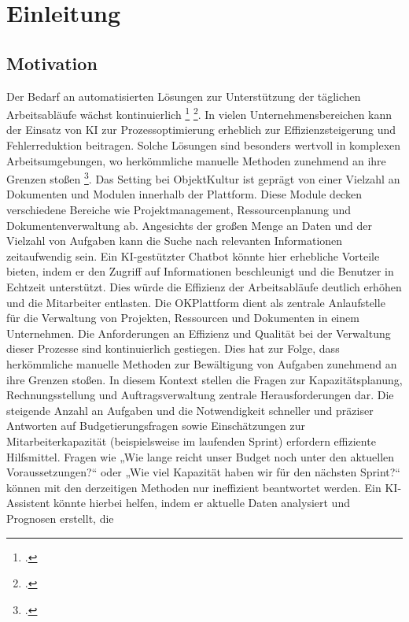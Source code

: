 \chapter{Einleitung}

\section{Motivation}

Der Bedarf an automatisierten Lösungen zur Unterstützung der täglichen Arbeitsabläufe wächst 
kontinuierlich \footcite{demary_kunstliche_2019} \footcite{feike_kunstliche_2024}. In vielen Unternehmensbereichen kann der Einsatz von \ac{KI} zur Prozessoptimierung erheblich zur Effizienzsteigerung und Fehlerreduktion beitragen. Solche Lösungen sind besonders 
wertvoll in komplexen Arbeitsumgebungen, wo herkömmliche manuelle Methoden zunehmend an ihre 
Grenzen stoßen \footcite{lenzen_kunstliche_2023}.
Das Setting bei ObjektKultur ist geprägt von einer Vielzahl an Dokumenten und Modulen innerhalb der 
Plattform. Diese Module decken verschiedene Bereiche wie Projektmanagement, Ressourcenplanung 
und Dokumentenverwaltung ab. Angesichts der großen Menge an Daten und der Vielzahl von Aufgaben 
kann die Suche nach relevanten Informationen zeitaufwendig sein. Ein \ac{KI}-gestützter Chatbot könnte 
hier erhebliche Vorteile bieten, indem er den Zugriff auf Informationen beschleunigt und die Benutzer 
in Echtzeit unterstützt. Dies würde die Effizienz der Arbeitsabläufe deutlich erhöhen und die Mitarbeiter 
entlasten.
Die OKPlattform dient als zentrale Anlaufstelle für die Verwaltung von Projekten, Ressourcen und 
Dokumenten in einem Unternehmen. Die Anforderungen an Effizienz und Qualität bei der Verwaltung 
dieser Prozesse sind kontinuierlich gestiegen. Dies hat zur Folge, dass herkömmliche manuelle 
Methoden zur Bewältigung von Aufgaben zunehmend an ihre Grenzen stoßen.
In diesem Kontext stellen die Fragen zur Kapazitätsplanung, Rechnungsstellung und Auftragsverwaltung 
zentrale Herausforderungen dar. Die steigende Anzahl an Aufgaben und die Notwendigkeit schneller 
und präziser Antworten auf Budgetierungsfragen sowie Einschätzungen zur Mitarbeiterkapazität 
(beispielsweise im laufenden Sprint) erfordern effiziente Hilfsmittel. Fragen wie „Wie lange reicht unser 
Budget noch unter den aktuellen Voraussetzungen?“ oder „Wie viel Kapazität haben wir für den 
nächsten Sprint?“ können mit den derzeitigen Methoden nur ineffizient beantwortet werden.
Ein \ac{KI}-Assistent könnte hierbei helfen, indem er aktuelle Daten analysiert und Prognosen erstellt, die 
